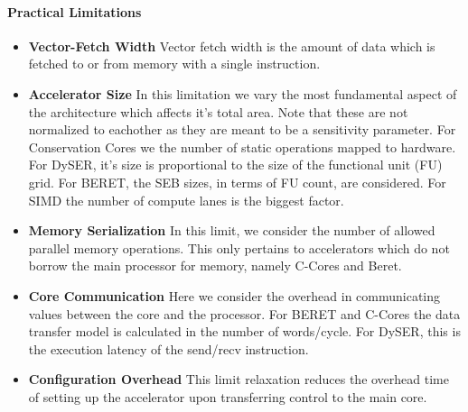 \paragraph{Practical Limitations}
\begin{itemize}
  \item \textbf{Vector-Fetch Width}
  Vector fetch width is the amount of data which is fetched to or from memory with 
a single instruction. 

\item \textbf{Accelerator Size} In this limitation we vary the most fundamental
aspect of the architecture which affects it's total area.  Note that these are
not normalized to eachother as they are
meant to be a sensitivity parameter. For Conservation Cores we
the number of static operations mapped to hardware.  For DySER, it's size is proportional to the size of the functional unit (FU) grid.  For BERET, the SEB sizes, in terms
of FU count, are considered.  For SIMD the number of compute lanes is the biggest
factor.

\item \textbf{Memory Serialization}
In this limit, we consider the number of allowed parallel memory operations.  
This only pertains to accelerators which do not borrow the main processor
for memory, namely C-Cores and Beret.

\item \textbf{Core Communication}
Here we consider the overhead in communicating values between the 
core and the processor.  For BERET and C-Cores the data transfer model
is calculated in the number of words/cycle.  For DySER, this is the execution
latency of the send/recv instruction.

\item \textbf{Configuration Overhead}
This limit relaxation reduces the overhead time of setting up the accelerator
upon transferring control to the main core.

\end{itemize}


